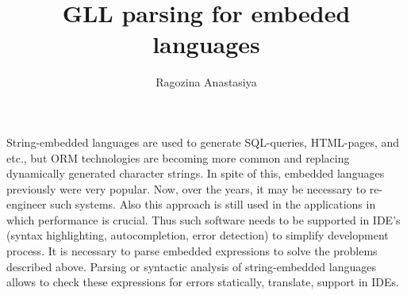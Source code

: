 \documentclass{sig-alternate} %
\begin{document}
\makeatletter
\def\@copyrightspace{\relax}
\makeatother

\title{GLL parsing for embeded languages} %

\author{Ragozina Anastasiya \\ 
}


\maketitle


String-embedded languages are used to generate SQL-queries, HTML-pages, and etc., but ORM technologies are becoming more common and replacing dynamically generated character strings. In spite of this, embedded languages previously were very popular. Now, over the years, it may be necessary to re-engineer such systems. Also this approach is still used in the applications in which performance is crucial. Thus such software needs to be supported in IDE’s (syntax highlighting, autocompletion, error detection) to simplify development process. It is necessary to parse embedded expressions to solve the problems described above. Parsing or syntactic analysis of string-embedded languages allows to check these expressions for errors statically, translate, support in IDEs. 
\end{document}
